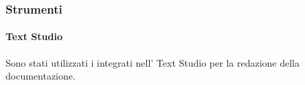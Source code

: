         \subsubsection{Strumenti}
            \paragraph{Text Studio}
            	Sono stati utilizzati i  integrati nell' Text Studio per la redazione della documentazione.